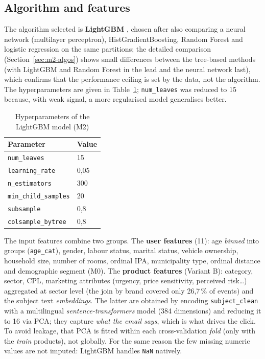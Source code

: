 \subsection{Algorithm and features}

The algorithm selected is \textbf{LightGBM} \cite{ke2017lightgbm}, chosen after also comparing a neural network (multilayer perceptron), HistGradientBoosting, Random Forest and logistic regression on the same partitions; the detailed comparison (Section~\ref{sec:m2-algos}) shows small differences between the tree-based methods (with LightGBM and Random Forest in the lead and the neural network last), which confirms that the performance ceiling is set by the data, not the algorithm. The hyperparameters are given in Table~\ref{tab:lgbm_params}; \texttt{num\_leaves} was reduced to 15 because, with weak signal, a more regularised model generalises better.

\begin{table}[htbp]
\centering
\caption{Hyperparameters of the LightGBM model (M2)}
\label{tab:lgbm_params}
\begin{tabular}{ll}
\toprule
\textbf{Parameter} & \textbf{Value} \\
\midrule
\texttt{num\_leaves}          & 15   \\
\texttt{learning\_rate}       & 0,05 \\
\texttt{n\_estimators}        & 300  \\
\texttt{min\_child\_samples}  & 20   \\
\texttt{subsample}            & 0,8  \\
\texttt{colsample\_bytree}    & 0,8  \\
\bottomrule
\end{tabular}
\end{table}

The input features combine two groups. The \textbf{user features} (11): age \emph{binned} into groups (\texttt{age\_cat}), gender, labour status, marital status, vehicle ownership, household size, number of rooms, ordinal IPA, municipality type, ordinal distance and demographic segment (M0). The \textbf{product features} (Variant B): category, sector, CPL, marketing attributes (urgency, price sensitivity, perceived risk\ldots) aggregated at sector level (the join by brand covered only 26,7\,\% of events) and the subject text \textit{embeddings}. The latter are obtained by encoding \texttt{subject\_clean} with a multilingual \textit{sentence-transformers} model (384 dimensions) and reducing it to 16 via PCA; they capture \emph{what the email says}, which is what drives the click. To avoid leakage, that PCA is fitted within each cross-validation \textit{fold} (only with the \textit{train} products), not globally. For the same reason the few missing numeric values are not imputed: LightGBM handles \texttt{NaN} natively.

